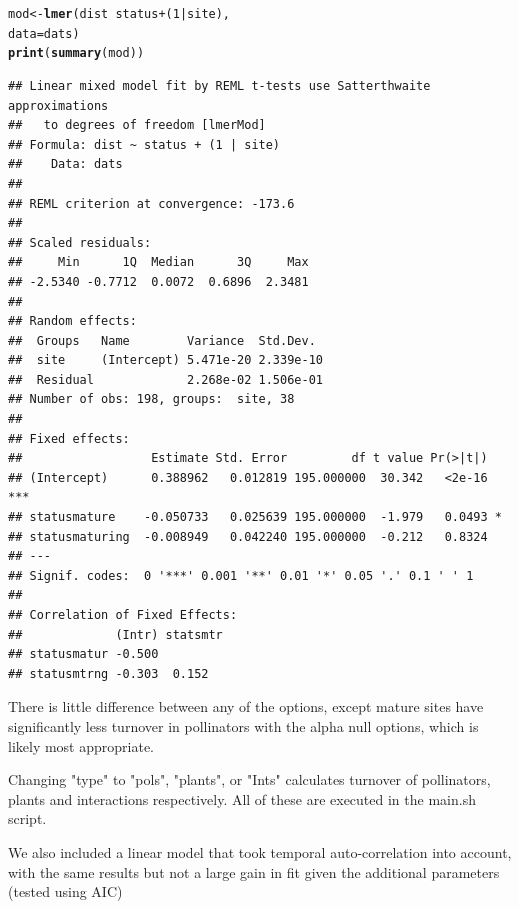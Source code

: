 \documentclass{article}\usepackage[]{graphicx}\usepackage[]{color}
\makeatletter
\newcommand{\hlnum}[1]{\textcolor[rgb]{0.686,0.059,0.569}{#1}}%
\newcommand{\hlopt}[1]{\textcolor[rgb]{0,0,0}{#1}}%
\newcommand{\hlstd}[1]{\textcolor[rgb]{0.345,0.345,0.345}{#1}}%
\newcommand{\hlkwb}[1]{\textcolor[rgb]{0.69,0.353,0.396}{#1}}%
\newcommand{\hlkwc}[1]{\textcolor[rgb]{0.333,0.667,0.333}{#1}}%
\newcommand{\hlkwd}[1]{\textcolor[rgb]{0.737,0.353,0.396}{\textbf{#1}}}%
\newenvironment{kframe}{%
 \def\at@end@of@kframe{}%
 \ifinner\ifhmode%
  \def\at@end@of@kframe{\end{minipage}}%
  \begin{minipage}{\columnwidth}%
 \fi\fi%
 \def\FrameCommand##1{\hskip\@totalleftmargin \hskip-\fboxsep
 \colorbox{shadecolor}{##1}\hskip-\fboxsep
     \hskip-\linewidth \hskip-\@totalleftmargin \hskip\columnwidth}%
 \MakeFramed {\advance\hsize-\width
   \@totalleftmargin\z@ \linewidth\hsize
   \@setminipage}}%
 {\par\unskip\endMakeFramed%
 \at@end@of@kframe}
\newenvironment{knitrout}{}{} %
\makeatother
\begin{document}
\begin{knitrout}
\color{fgcolor}\begin{kframe}
\begin{alltt}
\hlstd{mod} \hlkwb{<-} \hlkwd{lmer}\hlstd{(dist} \hlopt{~} \hlstd{status} \hlopt{+}  \hlstd{(}\hlnum{1}\hlopt{|}\hlstd{site),}
            \hlkwc{data}\hlstd{=dats)}
\hlkwd{print}\hlstd{(}\hlkwd{summary}\hlstd{(mod))}
\end{alltt}
\begin{verbatim}
## Linear mixed model fit by REML t-tests use Satterthwaite approximations
##   to degrees of freedom [lmerMod]
## Formula: dist ~ status + (1 | site)
##    Data: dats
## 
## REML criterion at convergence: -173.6
## 
## Scaled residuals: 
##     Min      1Q  Median      3Q     Max 
## -2.5340 -0.7712  0.0072  0.6896  2.3481 
## 
## Random effects:
##  Groups   Name        Variance  Std.Dev. 
##  site     (Intercept) 5.471e-20 2.339e-10
##  Residual             2.268e-02 1.506e-01
## Number of obs: 198, groups:  site, 38
## 
## Fixed effects:
##                  Estimate Std. Error         df t value Pr(>|t|)    
## (Intercept)      0.388962   0.012819 195.000000  30.342   <2e-16 ***
## statusmature    -0.050733   0.025639 195.000000  -1.979   0.0493 *  
## statusmaturing  -0.008949   0.042240 195.000000  -0.212   0.8324    
## ---
## Signif. codes:  0 '***' 0.001 '**' 0.01 '*' 0.05 '.' 0.1 ' ' 1
## 
## Correlation of Fixed Effects:
##             (Intr) statsmtr
## statusmatur -0.500         
## statusmtrng -0.303  0.152
\end{verbatim}
\end{kframe}
\end{knitrout}

There is little difference between any of the options, except mature
sites have significantly less turnover in pollinators with the alpha
null options, which is likely most appropriate.

Changing "type" to "pols", "plants", or "Ints" calculates turnover of
pollinators, plants and interactions respectively. All of these are
executed in the main.sh script.

We also included a linear model that took temporal auto-correlation
into account, with the same results but not a large gain in fit given
the additional parameters (tested using AIC)
\end{document}
